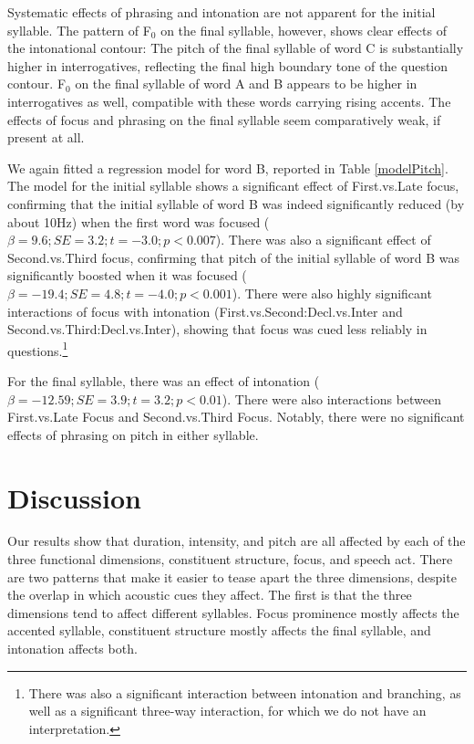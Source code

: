 \documentclass[preprint,review,12pt,authoryear,times]{elsarticle}
\begin{document}
 Systematic effects of phrasing and intonation are not apparent for the initial syllable. The pattern of F$_0$ on the final syllable, however, shows clear effects of the intonational contour: The pitch of the final syllable of word  C is substantially higher in interrogatives, reflecting the final high boundary tone of the question contour. F$_0$ on the final syllable of word A and B appears to be higher in interrogatives as well, compatible with these words carrying rising accents. The effects of focus and phrasing on the final syllable seem comparatively weak, if present at all.

We again fitted a regression model for word B, reported in Table \ref{modelPitch}. The model for the initial syllable shows a significant effect of First.vs.Late focus, confirming that the initial syllable of word B was indeed significantly reduced (by about 10Hz) when the first word was focused ($\beta=9.6; SE=3.2; t=-3.0; p<0.007$). There was also a significant effect of Second.vs.Third focus, confirming that pitch of the initial syllable of word B was significantly boosted when it was focused ($\beta=-19.4; SE=4.8; t=-4.0; p<0.001$). There were also highly significant interactions of focus with intonation (First.vs.Second:Decl.vs.Inter and Second.vs.Third:Decl.vs.Inter), showing that focus was cued less reliably in questions.\footnote{There was also a significant interaction between intonation and branching, as well as a significant three-way interaction, for which we do not have an interpretation.}



For the final syllable, there was an effect of intonation ($\beta=-12.59; SE=3.9; t=3.2; p<0.01$). There were also interactions between First.vs.Late Focus and Second.vs.Third Focus. Notably, there were no significant effects of phrasing on pitch in either syllable.


\section{Discussion}

Our results show that duration, intensity, and pitch are all affected by each of the three functional dimensions, constituent structure, focus, and speech act. There are two patterns that make it easier to tease apart the three dimensions, despite the overlap in which acoustic cues they affect. The first is that the three dimensions tend to affect different syllables. Focus prominence mostly affects the accented syllable, constituent structure mostly affects the final syllable, and intonation affects both. 
\end{document}
